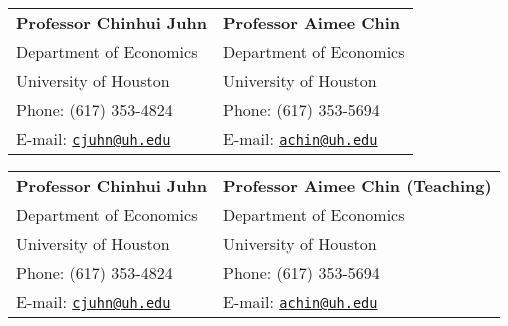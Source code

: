 \documentclass[margin, 11pt]{res} %
\begin{document}
\begin{resume}


\section{}

\vspace{.05in}
\begin{tabular}{@{}p{3in}p{4in}}
\textbf{Professor Chinhui Juhn}   						& \textbf{Professor Aimee Chin} \\            
Department of Economics   							& Department of Economics \\         
University of Houston 								& University of Houston\\       
Phone: (617) 353-4824 								& Phone: (617) 353-5694\\    
E-mail:  \href{mailto:cjuhn@uh.edu}{\nolinkurl{cjuhn@uh.edu}}& E-mail:  \href{mailto:achin@uh.edu}{\nolinkurl{achin@uh.edu}}
\end{tabular}

\vspace{.05in}
\begin{tabular}{@{}p{3in}p{4in}}
\textbf{Professor Chinhui Juhn}   						& \textbf{Professor Aimee Chin (Teaching)} \\            
Department of Economics   							& Department of Economics \\         
University of Houston 								& University of Houston\\       
Phone: (617) 353-4824 								& Phone: (617) 353-5694\\    
E-mail:  \href{mailto:cjuhn@uh.edu}{\nolinkurl{cjuhn@uh.edu}}& E-mail:  \href{mailto:achin@uh.edu}{\nolinkurl{achin@uh.edu}}
\end{tabular}



\end{resume}
\end{document}
